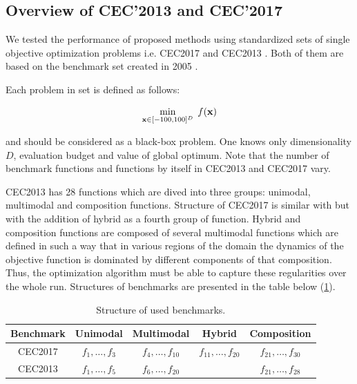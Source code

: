 \documentclass[runningheads,a4paper]{llncs}
\newcommand{\wek}[1]{
    {\bf #1} 
}
\begin{document}
\subsection{Overview of CEC'2013 and CEC'2017}

We tested the performance of proposed methods using standardized sets of single objective optimization problems i.e. CEC2017 \cite{cec2017} and CEC2013 \cite{2013}. Both of them are based on the benchmark set created in 2005 \cite{cec2005}.

Each problem in set is defined as follows:

\begin{equation*}
  \min_{\wek{x} \in [-100, 100]^{D}}\; f(\wek{x})
\end{equation*}

and should be considered as a black-box problem. One knows only dimensionality $D$, evaluation budget and value of global optimum. Note that the number of benchmark functions and functions by itself in CEC2013 and CEC2017 vary. 

CEC2013 has 28 functions which are dived into three groups: unimodal, multimodal and composition functions.
Structure of CEC2017 is similar with but with the addition of hybrid as a fourth group of function. 
Hybrid and composition functions are composed of several multimodal functions which are defined in such a way that in various regions of the
domain the dynamics of the objective function is dominated by different components of that composition.
Thus, the optimization algorithm must be able to capture these regularities over the whole run.
Structures of benchmarks are presented in the table below (\ref{cec-table}).

\begin{table}[H]
\label{cec-table}
\centering
\begin{tabular}{|c|c|c|l|l|l|c|c|}
\hline
Benchmark & Unimodal          & \multicolumn{4}{c|}{Multimodal}             & Hybrid                  & Composition             \\ \hline
CEC2017     & $f_1, \dots, f_3$ & \multicolumn{4}{c|}{$f_4, \dots, f_{10}$}   & $f_{11}, \dots, f_{20}$ & $f_{21}, \dots, f_{30}$ \\ \hline
CEC2013     & $f_1, \dots, f_5$ & \multicolumn{4}{c|}{$f_{6}, \dots, f_{20}$} &                         & $f_{21}, \dots, f_{28}$ \\ \hline
\end{tabular}
\caption{Structure of used benchmarks.}
\end{table}
\end{document}
